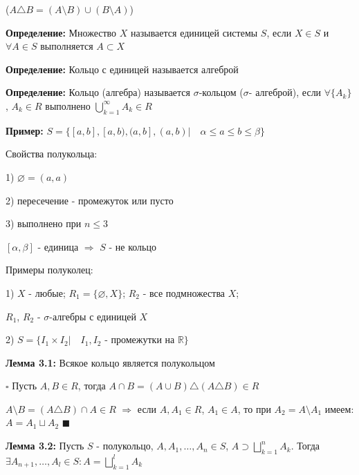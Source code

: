 \documentclass[a4paper]{report}
\begin{document}
($A\triangle B=(A\setminus B)\cup(B\setminus A)$)
\bigskip

\noindent\textbf{Определение:} Множество $X$ называется единицей системы $S$, если $X\in S$ и $\forall A\in S$ выполняется
$A\subset X$
\bigskip

\noindent\textbf{Определение:} Кольцо с единицей называется алгеброй
\bigskip

\noindent\textbf{Определение:} Кольцо (алгебра) называется $\sigma$-кольцом ($\sigma$- алгеброй), если $\forall\{A_k\}$,
$A_k\in R$ выполнено $\bigcup\limits_{k=1}^\infty A_k\in R$
\bigskip

\noindent\textbf{Пример:} $S=\{[a,b],[a,b),(a,b],(a,b)|\quad\alpha\le a\le b\le\beta\}$
\bigskip

\noindent Свойства полукольца:

1) $\varnothing=(a,a)$

2) пересечение - промежуток или пусто

3) выполнено при $n\le3$

$[\alpha,\beta]$ - единица $\Rightarrow$ $S$ - не кольцо
\bigskip

\noindent Примеры полуколец:

1) $X$ - любые; $R_1=\{\varnothing,X\}$; $R_2$ - все подмножества $X$;

$R_1$, $R_2$ - $\sigma$-алгебры с единицей $X$

2) $S=\{I_1\times I_2|\quad I_1,I_2$ - промежутки на $\mathbb R\}$
\bigskip

\noindent\textbf{Лемма 3.1:} Всякое кольцо является полукольцом

\noindent $\square$ Пусть $A,B\in R$, тогда $A\cap B=(A\cup B)\triangle(A\triangle B)\in R$

$A\setminus B=(A\triangle B)\cap A\in R$ $\Rightarrow$ если $A,A_1\in R$, $A_1\in A$, то при $A_2=A\setminus A_1$ имеем:
$A=A_1\sqcup A_2$ $\blacksquare$
\bigskip

\noindent\textbf{Лемма 3.2:} Пусть $S$ - полукольцо, $A,A_1,\ldots,A_n\in S$, $A\supset\bigsqcup\limits_{k=1}^n A_k$.
Тогда $\exists A_{n+1},\ldots,A_l\in S\colon A=\bigsqcup\limits_{k=1}^l A_k$
\end{document}
